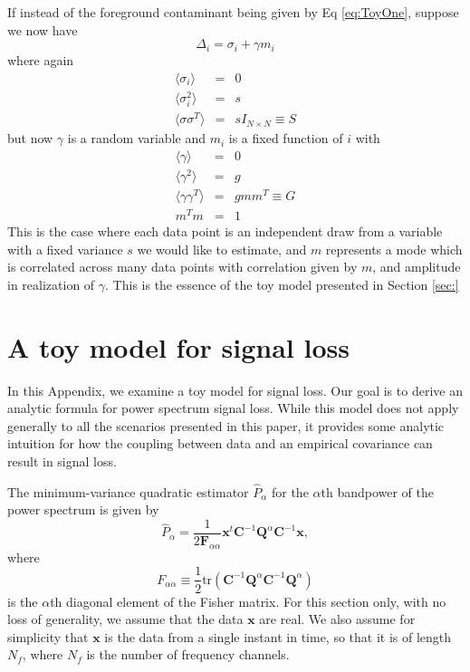 \documentclass[preprint2,numberedappendix,tighten]{aastex6}
\newcommand{\x}{\mathbf{x}}
\newcommand{\C}{\mathbf{C}}
\newcommand{\F}{\mathbf{F}}
\newcommand{\Q}{\mathbf{Q}}
\begin{document}
If instead of the foreground contaminant being given by Eq \ref{eq:ToyOne}, suppose we now have
\begin{equation}
\Delta_i = \sigma_i + \gamma m_i
\end{equation}
where again
\begin{eqnarray}
\langle \sigma_i \rangle & = & 0 \\
\langle \sigma^2_i \rangle & = & s \\
 \langle \sigma \sigma^T \rangle & = & s I_{N \times N} \equiv S
\end{eqnarray}
but now $\gamma$ is a random variable and $m_i$ is a fixed function of $i$ with
\begin{eqnarray}
\langle \gamma \rangle & = & 0 \\
\langle \gamma^2 \rangle & = & g \\
 \langle \gamma \gamma^T \rangle & = & g m m^T \equiv G \\
 m^T m & = & 1
\end{eqnarray}
This is the case where each data point is an independent draw from a variable with a fixed variance $s$ we would like to estimate, and $m$ represents a mode which is correlated across many data points with correlation given by $m$, and amplitude in realization of $\gamma$.
This is the essence of the toy model presented in Section \ref{sec:}

\color{black}

\appendix
\section{A toy model for signal loss}
\label{sec:sigloss_appendix}

In this Appendix, we examine a toy model for signal loss. Our goal is to derive an analytic formula for power spectrum signal loss. While this 
model does not apply generally to all the scenarios presented in this paper, it provides some analytic intuition for how the coupling between data and an empirical covariance can result in signal loss.

The minimum-variance quadratic estimator $\widehat{P}_\alpha$ for the $\alpha$th bandpower of the power spectrum is given by 
\begin{equation}
\widehat{P}_\alpha = \frac{1} {2 \F_{\alpha \alpha} }\x^t \C^{-1} \Q^{\alpha} \C^{-1} \x,
\end{equation}
where
\begin{equation}
F_{\alpha \alpha} \equiv \frac{1}{2} \textrm{tr} \left( \C^{-1} \Q^\alpha \C^{-1} \Q^\alpha \right)
\end{equation}
is the $\alpha$th diagonal element of the Fisher matrix. For this section only, with no loss of generality, we assume that the data $\textbf{x}$ are real. We also assume for simplicity that $\mathbf{x}$ is the data from a single instant in time, so that it is of length $N_f$, where $N_f$ is the number of frequency channels.
\end{document}
